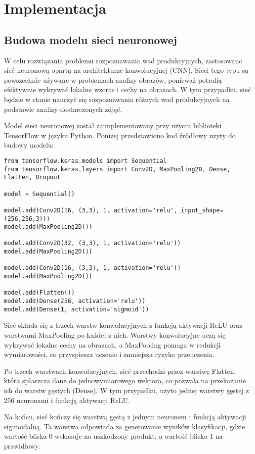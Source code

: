 \chapter{Implementacja}
\section{Budowa modelu sieci neuronowej}

W celu rozwiązania problemu rozpoznawania wad produkcyjnych, zastosowano sieć neuronową opartą na architekturze konwolucyjnej (CNN). Sieci tego typu są powszechnie używane w problemach analizy obrazów, ponieważ potrafią efektywnie wykrywać lokalne wzorce i cechy na obrazach. W tym przypadku, sieć będzie w stanie nauczyć się rozpoznawania różnych wad produkcyjnych na podstawie analizy dostarczonych zdjęć.

Model sieci neuronowej został zaimplementowany przy użyciu biblioteki TensorFlow w języku Python. Poniżej przedstawiono kod źródłowy użyty do budowy modelu:

\begin{verbatim}
from tensorflow.keras.models import Sequential
from tensorflow.keras.layers import Conv2D, MaxPooling2D, Dense, Flatten, Dropout

model = Sequential()

model.add(Conv2D(16, (3,3), 1, activation='relu', input_shape=(256,256,3)))
model.add(MaxPooling2D())

model.add(Conv2D(32, (3,3), 1, activation='relu'))
model.add(MaxPooling2D())

model.add(Conv2D(16, (3,3), 1, activation='relu'))
model.add(MaxPooling2D())

model.add(Flatten())
model.add(Dense(256, activation='relu'))
model.add(Dense(1, activation='sigmoid'))
\end{verbatim}

Sieć składa się z trzech warstw konwolucyjnych z funkcją aktywacji ReLU oraz warstwami MaxPooling po każdej z nich. Warstwy konwolucyjne uczą się wykrywać lokalne cechy na obrazach, a MaxPooling pomaga w redukcji wymiarowości, co przyspiesza uczenie i zmniejsza ryzyko przeuczenia.

Po trzech warstwach konwolucyjnych, sieć przechodzi przez warstwę Flatten, która spłaszcza dane do jednowymiarowego wektora, co pozwala na przekazanie ich do warstw gęstych (Dense). W tym przypadku, użyto jednej warstwy gęstej z 256 neuronami i funkcją aktywacji ReLU.

Na końcu, sieć kończy się warstwą gęstą z jednym neuronem i funkcją aktywacji sigmoidalną. Ta warstwa odpowiada za generowanie wyników klasyfikacji, gdzie wartość bliska 0 wskazuje na uszkodzony produkt, a wartość bliska 1 na prawidłowy.

